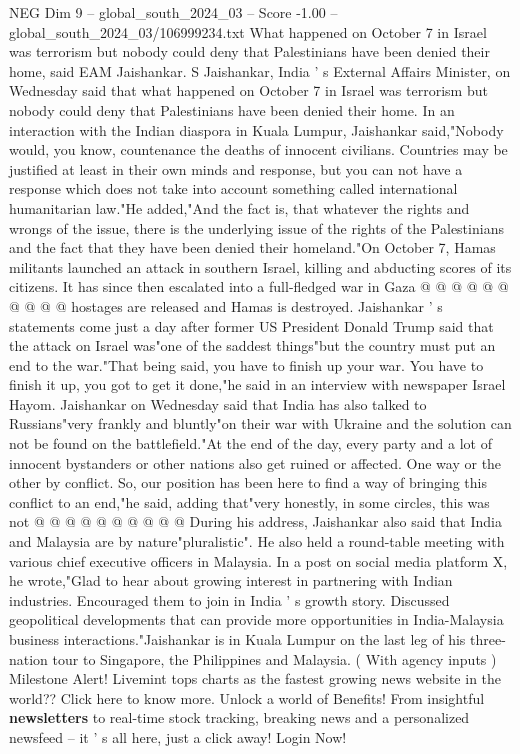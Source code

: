 \begin{textsample}{NEG Dim 9 – global\_south\_2024\_03 – Score -1.00 – global\_south\_2024\_03/106999234.txt}  \label{ex:f9_neg_408}
What happened on October 7 in Israel was terrorism but nobody could deny that Palestinians have been denied their home, said EAM Jaishankar.
S Jaishankar, India ' s External Affairs Minister, on Wednesday said that what happened on October 7 in Israel was terrorism but nobody could deny that Palestinians have been denied their home.
In an interaction with the Indian diaspora in Kuala Lumpur, Jaishankar said,"Nobody would, you know, countenance the deaths of innocent civilians.
Countries may be justified at least in their own minds and response, but you can not have a response which does not take into account something called international humanitarian law."He added,"And the fact is, that whatever the rights and wrongs of the issue, there is the underlying issue of the rights of the Palestinians and the fact that they have been denied their homeland."On October 7, Hamas militants launched an attack in southern Israel, killing and abducting scores of its citizens.
It has since then escalated into a full-fledged war in Gaza @ @ @ @ @ @ @ @ @ @ hostages are released and Hamas is destroyed.
Jaishankar ' s statements come just a day after former US President Donald Trump said that the attack on Israel was"one of the saddest things"but the country must put an end to the war."That being said, you have to finish up your war.
You have to finish it up, you got to get it done,"he said in an interview with newspaper Israel Hayom.
Jaishankar on Wednesday said that India has also talked to Russians"very frankly and bluntly"on their war with Ukraine and the solution can not be found on the battlefield."At the end of the day, every party and a lot of innocent bystanders or other nations also get ruined or affected.
One way or the other by conflict.
So, our position has been here to find a way of bringing this conflict to an end,"he said, adding that"very honestly, in some circles, this was not @ @ @ @ @ @ @ @ @ @ During his address, Jaishankar also said that India and Malaysia are by nature"pluralistic".
He also held a round-table meeting with various chief executive officers in Malaysia.
In a post on social media platform X, he wrote,"Glad to hear about growing interest in partnering with Indian industries.
Encouraged them to join in India ' s growth story.
Discussed geopolitical developments that can provide more opportunities in India-Malaysia business interactions."Jaishankar is in Kuala Lumpur on the last leg of his three-nation tour to Singapore, the Philippines and Malaysia. ( With agency inputs ) Milestone Alert!
Livemint tops charts as the fastest growing news website in the world??
Click here to know more.
Unlock a world of Benefits!
From insightful \textbf{newsletters} to real-time stock tracking, breaking news and a personalized newsfeed -- it ' s all here, just a click away!
Login Now!

\end{textsample}
